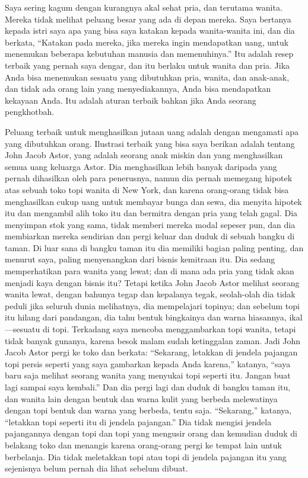\documentclass[
  letterpaper,
  DIV=11,
  numbers=noendperiod]{scrreprt}
\begin{document}
Saya sering kagum dengan kurangnya akal sehat pria, dan terutama wanita.
Mereka tidak melihat peluang besar yang ada di depan mereka. Saya
bertanya kepada istri saya apa yang bisa saya katakan kepada
wanita-wanita ini, dan dia berkata, ``Katakan pada mereka, jika mereka
ingin mendapatkan uang, untuk menemukan beberapa kebutuhan manusia dan
memenuhinya.'' Itu adalah resep terbaik yang pernah saya dengar, dan itu
berlaku untuk wanita dan pria. Jika Anda bisa menemukan sesuatu yang
dibutuhkan pria, wanita, dan anak-anak, dan tidak ada orang lain yang
menyediakannya, Anda bisa mendapatkan kekayaan Anda. Itu adalah aturan
terbaik bahkan jika Anda seorang pengkhotbah.

Peluang terbaik untuk menghasilkan jutaan uang adalah dengan mengamati
apa yang dibutuhkan orang. Ilustrasi terbaik yang bisa saya berikan
adalah tentang John Jacob Astor, yang adalah seorang anak miskin dan
yang menghasilkan semua uang keluarga Astor. Dia menghasilkan lebih
banyak daripada yang pernah dihasilkan oleh para penerusnya, namun dia
pernah memegang hipotek atas sebuah toko topi wanita di New York, dan
karena orang-orang tidak bisa menghasilkan cukup uang untuk membayar
bunga dan sewa, dia menyita hipotek itu dan mengambil alih toko itu dan
bermitra dengan pria yang telah gagal. Dia menyimpan stok yang sama,
tidak memberi mereka modal sepeser pun, dan dia membiarkan mereka
sendirian dan pergi keluar dan duduk di sebuah bangku di taman. Di luar
sana di bangku taman itu dia memiliki bagian paling penting, dan menurut
saya, paling menyenangkan dari bisnis kemitraan itu. Dia sedang
memperhatikan para wanita yang lewat; dan di mana ada pria yang tidak
akan menjadi kaya dengan bisnis itu? Tetapi ketika John Jacob Astor
melihat seorang wanita lewat, dengan bahunya tegap dan kepalanya tegak,
seolah-olah dia tidak peduli jika seluruh dunia melihatnya, dia
mempelajari topinya; dan sebelum topi itu hilang dari pandangan, dia
tahu bentuk bingkainya dan warna hiasannya, ikal---sesuatu di topi.
Terkadang saya mencoba menggambarkan topi wanita, tetapi tidak banyak
gunanya, karena besok malam sudah ketinggalan zaman. Jadi John Jacob
Astor pergi ke toko dan berkata: ``Sekarang, letakkan di jendela
pajangan topi persis seperti yang saya gambarkan kepada Anda karena,''
katanya, ``saya baru saja melihat seorang wanita yang menyukai topi
seperti itu. Jangan buat lagi sampai saya kembali.'' Dan dia pergi lagi
dan duduk di bangku taman itu, dan wanita lain dengan bentuk dan warna
kulit yang berbeda melewatinya dengan topi bentuk dan warna yang
berbeda, tentu saja. ``Sekarang,'' katanya, ``letakkan topi seperti itu
di jendela pajangan.'' Dia tidak mengisi jendela pajangannya dengan topi
dan topi yang mengusir orang dan kemudian duduk di belakang toko dan
menangis karena orang-orang pergi ke tempat lain untuk berbelanja. Dia
tidak meletakkan topi atau topi di jendela pajangan itu yang sejenisnya
belum pernah dia lihat sebelum dibuat.
\end{document}
